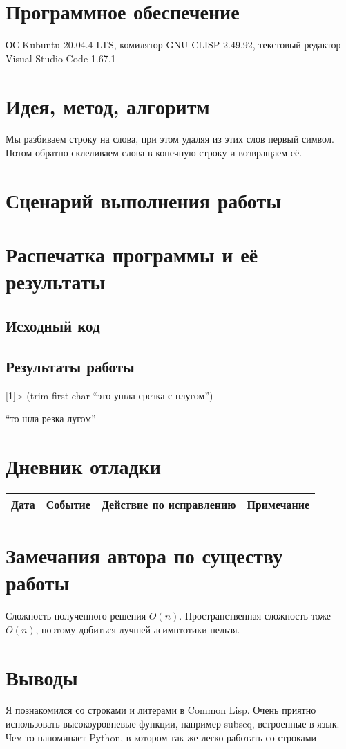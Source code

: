 \documentclass[12pt]{article}
\begin{document}
\section{Программное обеспечение}
ОС Kubuntu 20.04.4 LTS, комилятор GNU CLISP 2.49.92, текстовый редактор Visual Studio Code 1.67.1

\pagebreak
\section{Идея, метод, алгоритм}
Мы разбиваем строку на слова, при этом удаляя из этих слов первый символ. Потом обратно склеливаем слова в конечную строку и
возвращаем её.

\section{Сценарий выполнения работы}

\section{Распечатка программы и её результаты}

\subsection{Исходный код}


\pagebreak
\subsection{Результаты работы}
[1]> (trim-first-char \enquote{это  ушла срезка  с плугом})


\enquote{то шла резка лугом}

\pagebreak
\section{Дневник отладки}
\begin{tabular}{|p{50pt}|p{140pt}|p{140pt}|p{80pt}|}
\hline
Дата & Событие & Действие по исправлению & Примечание \\
\hline
\end{tabular}

\section{Замечания автора по существу работы}

Сложность полученного решения $O(n)$. Пространственная сложность тоже $O(n)$, поэтому добиться лучшей асимптотики нельзя.

\section{Выводы}
Я познакомился со строками и литерами в Common Lisp. Очень приятно использовать высокоуровневые функции, например subseq,
встроенные в язык. Чем-то напоминает Python, в котором так же легко работать со строками
\end{document}

